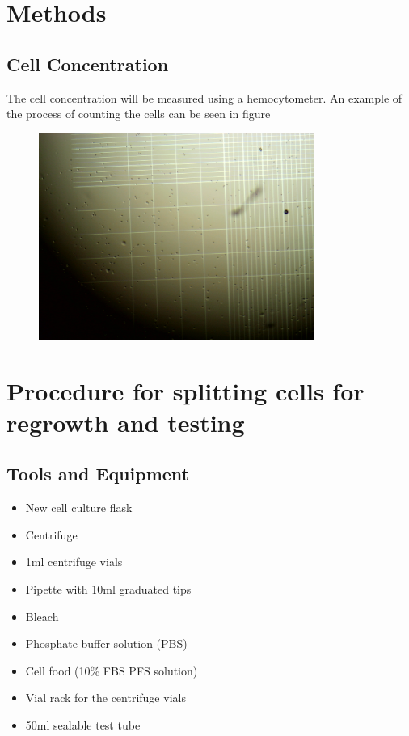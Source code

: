 \documentclass[journal]{IEEEtran}
\begin{document}
\section{Methods}

\subsection{Cell Concentration}
The cell concentration will be measured using a hemocytometer. An example of the process of counting the cells can be seen in figure

\begin{figure}[h]
\label{hemocytometer}
\includegraphics[width=9cm]{hemocytometer.jpg}
\end{figure}

\section{Procedure for splitting cells for regrowth and testing}
\subsection{Tools and Equipment}
\begin{itemize}
\item New cell culture flask
\item Centrifuge
\item 1ml centrifuge vials 
\item Pipette with 10ml graduated tips
\item Bleach
\item Phosphate buffer solution (PBS)
\item Cell food (10\% FBS PFS solution)
\item Vial rack for the centrifuge vials
\item 50ml sealable test tube
\end{itemize}
\end{document}
